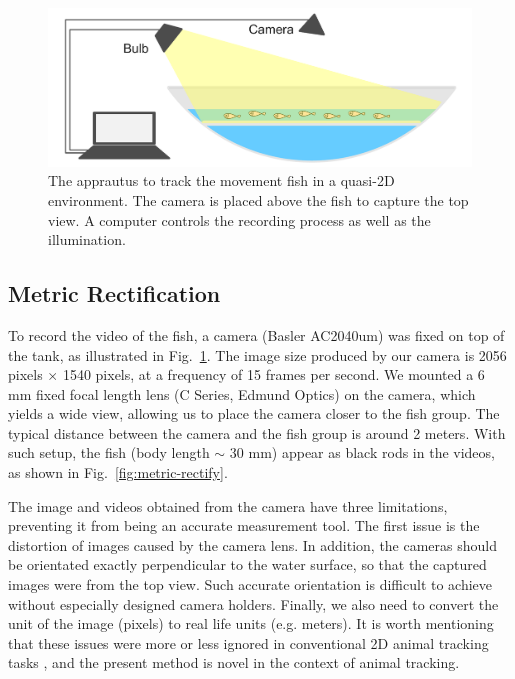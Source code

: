 \documentclass[11pt,twoside]{report}
\begin{document}
\begin{figure}
  \includegraphics[width=\linewidth]{apprautus-2d}
  \caption[Two dimensional fish tracking apprautus]{\label{fig:fish_apprautus_2d}
  The apprautus to track the movement fish in a quasi-2D environment. The camera is placed above the fish to capture the top view. A computer controls the recording process as well as the illumination.
  }
\end{figure}


\subsection{Metric Rectification}
\label{section:metric_rectify}


To record the video of the fish, a camera (Basler AC2040um) was fixed on top of the tank, as illustrated in Fig.~\ref{fig:fish_apprautus_2d}. The image size produced by our camera is 2056 pixels $\times$ 1540 pixels, at a frequency of 15 frames per second.
We mounted a 6 mm fixed focal length lens (C Series, Edmund Optics) on the camera, which yields a wide view, allowing us to place the camera closer to the fish group. The typical distance between the camera and the fish group is around 2 meters. With such setup, the fish (body length $\sim$ 30 mm) appear as black rods in the videos, as shown in Fig.~\ref{fig:metric-rectify}.


The image and videos obtained from the camera have three limitations, preventing it from being an accurate measurement tool.
The first issue is the distortion of images caused by the camera lens.
In addition, the cameras should be orientated exactly perpendicular to the water surface, so that the captured images were from the top view. Such accurate orientation is difficult to achieve without especially designed camera holders.
Finally, we also need to convert the unit of the image (pixels) to real life units (e.g. meters).
It is worth mentioning that these issues were more or less ignored in conventional 2D animal tracking tasks \cite{panadeiro2021}, and the present method is novel in the context of animal tracking.
\end{document}
